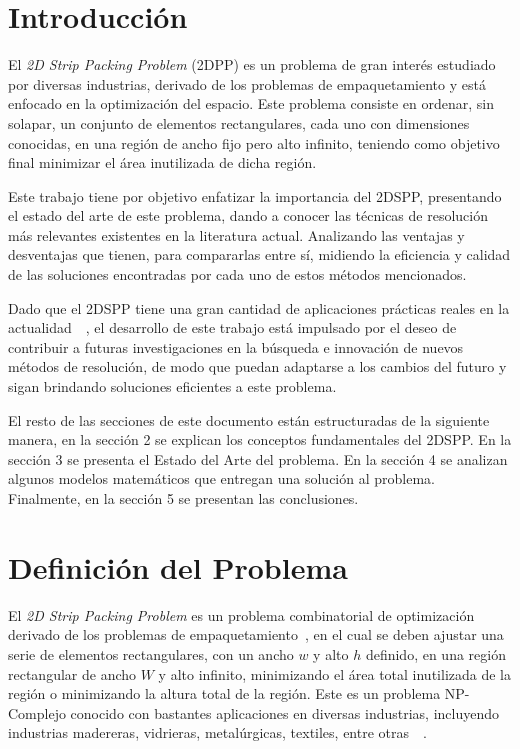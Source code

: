 \documentclass[letter, 10pt]{article}
\begin{document}
\section{Introducci\'on}

El \emph{2D Strip Packing Problem} (2DPP) es un problema de gran inter\'es estudiado por diversas industrias, derivado de los problemas de empaquetamiento y est\'a enfocado en la optimizaci\'on del espacio. Este problema consiste en ordenar, sin solapar, un conjunto de elementos rectangulares, cada uno con dimensiones conocidas, en una regi\'on de ancho fijo pero alto infinito, teniendo como objetivo final minimizar el \'area inutilizada de dicha regi\'on.

Este trabajo tiene por objetivo enfatizar la importancia del 2DSPP, presentando el estado del arte de este problema, dando a conocer las t\'ecnicas de resoluci\'on m\'as relevantes existentes en la literatura actual. Analizando las ventajas y desventajas que tienen, para compararlas entre s\'i, midiendo la eficiencia y calidad de las soluciones encontradas por cada uno de estos m\'etodos mencionados.

Dado que el 2DSPP tiene una gran cantidad de aplicaciones pr\'acticas reales en la actualidad~\cite{junior2022rectangular}~\cite{vasilyev2023generalized}, el desarrollo de este trabajo est\'a impulsado por el deseo de contribuir a futuras investigaciones en la b\'usqueda e innovaci\'on de nuevos m\'etodos de resoluci\'on, de modo que puedan adaptarse a los cambios del futuro y sigan brindando soluciones eficientes a este problema.

El resto de las secciones de este documento est\'an estructuradas de la siguiente manera, en la secci\'on 2 se explican los conceptos fundamentales del 2DSPP. En la secci\'on 3 se presenta el Estado del Arte del problema. En la secci\'on 4 se analizan algunos modelos matem\'aticos que entregan una soluci\'on al problema. Finalmente, en la secci\'on 5 se presentan las conclusiones.

\section{Definici\'on del Problema}

El \emph{2D Strip Packing Problem} es un problema combinatorial de optimizaci\'on derivado de los problemas de empaquetamiento~\cite{oliveira2016survey}, en el cual se deben ajustar una serie de elementos rectangulares, con un ancho $w$ y alto $h$ definido, en una regi\'on rectangular de ancho $W$ y alto infinito, minimizando el \'area total inutilizada de la regi\'on o minimizando la altura total de la regi\'on. Este es un problema NP-Complejo conocido con bastantes aplicaciones en diversas industrias, incluyendo industrias madereras, vidrieras, metal\'urgicas, textiles, entre otras~\cite{lodi2002two}~\cite{vasilyev2023generalized}.
\end{document}
